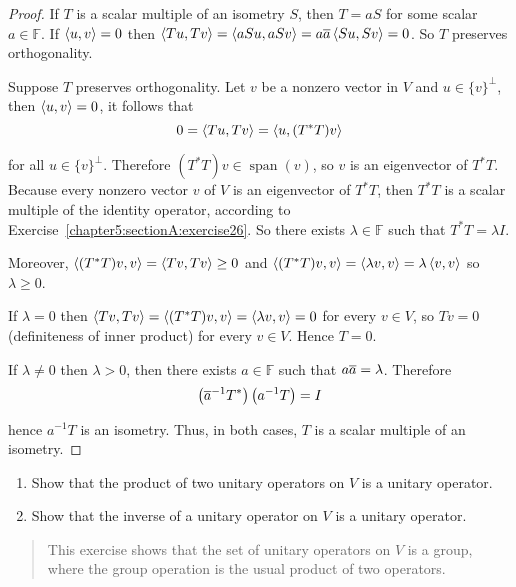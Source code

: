 \begin{proof}
    If $T$ is a scalar multiple of an isometry $S$, then $T = a S$ for some scalar $a\in\mathbb{F}$. If $\left\langle{u, v}\right\rangle = 0$ then $\left\langle{Tu, Tv}\right\rangle = \left\langle{aSu, aSv}\right\rangle = a\overline{a}\left\langle{Su, Sv}\right\rangle = 0$. So $T$ preserves orthogonality.

    \bigskip
    Suppose $T$ preserves orthogonality. Let $v$ be a nonzero vector in $V$ and $u \in {\{v\}}^{\bot}$, then $\left\langle{u, v}\right\rangle = 0$, it follows that
    \[
        0 = \left\langle{Tu, Tv}\right\rangle = \left\langle{u, (T^{*}T)v}\right\rangle
    \]

    for all $u\in {\{v\}}^{\bot}$. Therefore $(T^{*}T)v\in\operatorname{span}(v)$, so $v$ is an eigenvector of $T^{*}T$. Because every nonzero vector $v$ of $V$ is an eigenvector of $T^{*}T$, then $T^{*}T$ is a scalar multiple of the identity operator, according to Exercise~\ref{chapter5:sectionA:exercise26}. So there exists $\lambda\in\mathbb{F}$ such that $T^{*}T = \lambda I$.

    Moreover, $\left\langle{(T^{*}T)v, v}\right\rangle = \left\langle{Tv, Tv}\right\rangle\geq 0$ and $\left\langle{(T^{*}T)v, v}\right\rangle = \left\langle{\lambda v, v}\right\rangle = \lambda\left\langle{v, v}\right\rangle$ so $\lambda\geq 0$.

    If $\lambda = 0$ then $\left\langle{Tv, Tv}\right\rangle = \left\langle{(T^{*}T)v, v}\right\rangle = \left\langle{\lambda v, v}\right\rangle = 0$ for every $v\in V$, so $Tv = 0$ (definiteness of inner product) for every $v\in V$. Hence $T = 0$.

    If $\lambda \ne 0$ then $\lambda > 0$, then there exists $a\in\mathbb{F}$ such that $a\overline{a} = \lambda$. Therefore
    \[
        \left({\overline{a}}^{-1}T^{*}\right)\left(a^{-1}T\right) = I
    \]

    hence $a^{-1}T$ is an isometry. Thus, in both cases, $T$ is a scalar multiple of an isometry.
\end{proof}
\newpage

\begin{exercise}
    \begin{enumerate}[label={(\alph*)}]
        \item Show that the product of two unitary operators on $V$ is a unitary operator.
        \item Show that the inverse of a unitary operator on $V$ is a unitary operator.
    \end{enumerate}
\end{exercise}

\begin{quote}
    This exercise shows that the set of unitary operators on $V$ is a group, where the group operation is the usual product of two operators.
\end{quote}


